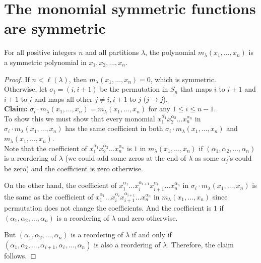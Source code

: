 \documentclass[12pt]{memoir}
\begin{document}
\section{The monomial symmetric functions are symmetric}

\begin{ptcb}
\begin{Prop}
For all positive integers $n$ and all partitions $\lambda$, the polynomial $m_\lambda(x_1, \dots, x_n)$ is a symmetric polynomial in $x_1, x_2, \dots, x_n$.
\end{Prop}
\end{ptcb}

\begin{proof}
If $n < \ell(\lambda)$, then $m_\lambda(x_1, \dots, x_n) = 0$, which is symmetric.\\
Otherwise, let $\sigma_i = (i, i+1)$ be the permutation in $S_n$ that maps $i$ to $i+1$ and $i+1$ to $i$ and maps all other $j \neq i, i+1$ to $j$ ($j \to j$).\\
\textbf{Claim:} $\sigma_i \cdot m_\lambda(x_1, \dots, x_n) = m_\lambda(x_1, \dots, x_n)$ for any $1 \le i \le n-1$.\\
To show this we must show that every monomial $x_1^{\alpha_1} x_2^{\alpha_2} \dots x_n^{\alpha_n}$ in $\sigma_i \cdot m_\lambda(x_1, \dots, x_n)$ has the same coefficient in both $\sigma_i \cdot m_\lambda(x_1, \dots, x_n)$ and $m_\lambda(x_1, \dots, x_n)$.\\
Note that the coefficient of $x_1^{\alpha_1} x_2^{\alpha_2} \dots x_n^{\alpha_n}$ is $1$ in $m_\lambda(x_1, \dots, x_n)$ if $(\alpha_1, \alpha_2, \dots, \alpha_n)$ is a reordering of $\lambda$ (we could add some zeros at the end of $\lambda$ as some $\alpha_j$'s could be zero) and the coefficient is zero otherwise.

On the other hand, the coefficient of $x_1^{\alpha_1} \dots x_i^{\alpha_{i+1}} x_{i+1}^{\alpha_i} \dots x_n^{\alpha_n}$ in $\sigma_i \cdot m_\lambda(x_1, \dots, x_n)$ is the same as the coefficient of $x_1^{\alpha_1} \dots x_i^{\alpha_i} x_{i+1}^{\alpha_{i+1}} \dots x_n^{\alpha_n}$ in $m_\lambda(x_1, \dots, x_n)$ since permutation does not change the coefficients. And the coefficient is $1$ if $(\alpha_1, \alpha_2, \dots, \alpha_n)$ is a reordering of $\lambda$ and zero otherwise.

But $(\alpha_1, \alpha_2, \dots, \alpha_n)$ is a reordering of $\lambda$ if and only if $(\alpha_1, \alpha_2, \dots, \alpha_{i+1}, \alpha_i, \dots, \alpha_n)$ is also a reordering of $\lambda$. Therefore, the claim follows.
\end{proof}
\end{document}
